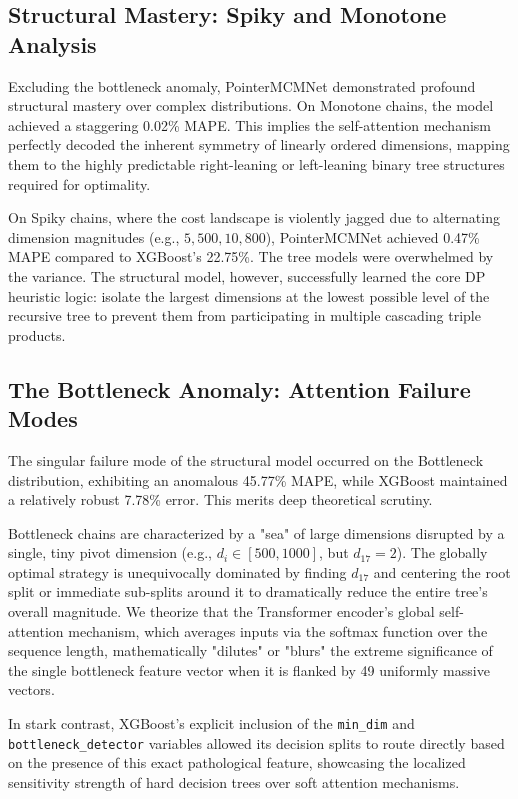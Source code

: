 \documentclass[conference]{IEEEtran}
\begin{document}
\subsection{Structural Mastery: Spiky and Monotone Analysis}
Excluding the bottleneck anomaly, PointerMCMNet demonstrated profound structural mastery over complex distributions. On Monotone chains, the model achieved a staggering 0.02\% MAPE. This implies the self-attention mechanism perfectly decoded the inherent symmetry of linearly ordered dimensions, mapping them to the highly predictable right-leaning or left-leaning binary tree structures required for optimality. 

On Spiky chains, where the cost landscape is violently jagged due to alternating dimension magnitudes (e.g., $5, 500, 10, 800$), PointerMCMNet achieved 0.47\% MAPE compared to XGBoost's 22.75\%. The tree models were overwhelmed by the variance. The structural model, however, successfully learned the core DP heuristic logic: isolate the largest dimensions at the lowest possible level of the recursive tree to prevent them from participating in multiple cascading triple products.

\subsection{The Bottleneck Anomaly: Attention Failure Modes}
The singular failure mode of the structural model occurred on the Bottleneck distribution, exhibiting an anomalous 45.77\% MAPE, while XGBoost maintained a relatively robust 7.78\% error. This merits deep theoretical scrutiny. 

Bottleneck chains are characterized by a "sea" of large dimensions disrupted by a single, tiny pivot dimension (e.g., $d_i \in [500, 1000]$, but $d_{17} = 2$). The globally optimal strategy is unequivocally dominated by finding $d_{17}$ and centering the root split or immediate sub-splits around it to dramatically reduce the entire tree's overall magnitude. We theorize that the Transformer encoder's global self-attention mechanism, which averages inputs via the softmax function over the sequence length, mathematically "dilutes" or "blurs" the extreme significance of the single bottleneck feature vector when it is flanked by 49 uniformly massive vectors. 

In stark contrast, XGBoost's explicit inclusion of the \texttt{min\_dim} and \texttt{bottleneck\_detector} variables allowed its decision splits to route directly based on the presence of this exact pathological feature, showcasing the localized sensitivity strength of hard decision trees over soft attention mechanisms.
\end{document}
